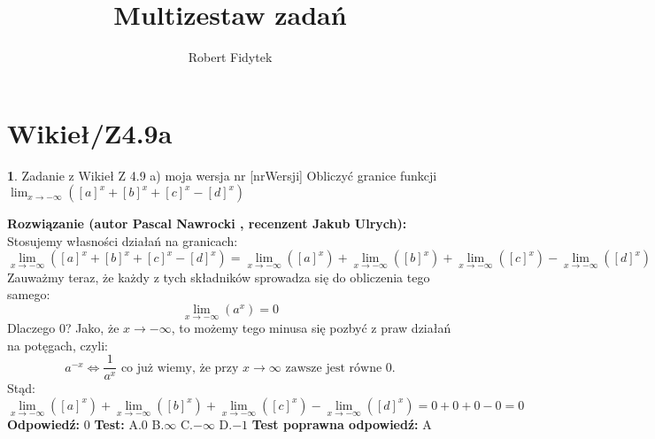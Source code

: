 \documentclass[12pt, a4paper]{article}
\title{Multizestaw zadań}
\author{Robert Fidytek}
\date{}
\theoremstyle{definition} %
\newtheorem{zad}{}
\newcommand{\kategoria}[1]{\section{#1}} %
\newcommand{\zadStart}[1]{\begin{zad}#1\newline} %
\newcommand{\zadStop}{\end{zad}}   %
\newcommand{\rozwStart}[2]{\noindent \textbf{Rozwiązanie (autor #1 , recenzent #2): }\newline} %
\newcommand{\rozwStop}{\newline}                                            %
\newcommand{\odpStart}{\noindent \textbf{Odpowiedź:}\newline}    %
\newcommand{\odpStop}{\newline}                                             %
\newcommand{\testStart}{\noindent \textbf{Test:}\newline} %
\newcommand{\testStop}{\newline} %
\newcommand{\kluczStart}{\noindent \textbf{Test poprawna odpowiedź:}\newline} %
\newcommand{\kluczStop}{\newline} %
\begin{document}
\maketitle


\kategoria{Wikieł/Z4.9a}
\zadStart{Zadanie z Wikieł Z 4.9 a) moja wersja nr [nrWersji]}
Obliczyć granice funkcji $\displaystyle{\lim_{x \to -\infty}}([a]^x+[b]^x+[c]^x-[d]^x)$
\zadStop
\rozwStart{Pascal Nawrocki}{Jakub Ulrych}
Stosujemy własności działań na granicach:
$$\displaystyle{\lim_{x \to -\infty}}([a]^x+[b]^x+[c]^x-[d]^x)=\displaystyle{\lim_{x \to -\infty}}([a]^x)+\displaystyle{\lim_{x \to -\infty}}([b]^x)+\displaystyle{\lim_{x \to -\infty}}([c]^x)-\displaystyle{\lim_{x \to -\infty}}([d]^x)$$
Zauważmy teraz, że każdy z tych składników sprowadza się do obliczenia tego samego:
$$\displaystyle{\lim_{x \to -\infty}}(a^x)=0$$
Dlaczego 0? Jako, że $x \to -\infty$, to możemy tego minusa się pozbyć z praw działań na potęgach, czyli:
$$a^{-x}\Leftrightarrow\frac{1}{a^x} \text{ co już wiemy, że przy $x \to \infty$ zawsze jest równe }0\text{.}$$
Stąd:
$$\displaystyle{\lim_{x \to -\infty}}([a]^x)+\displaystyle{\lim_{x \to -\infty}}([b]^x)+\displaystyle{\lim_{x \to -\infty}}([c]^x)-\displaystyle{\lim_{x \to -\infty}}([d]^x)=0+0+0-0=0$$
\rozwStop
\odpStart
$0$
\odpStop
\testStart
A.$0$
B.$\infty$
C.$-\infty$
D.$-1$
\testStop
\kluczStart
A
\kluczStop
\end{document}
